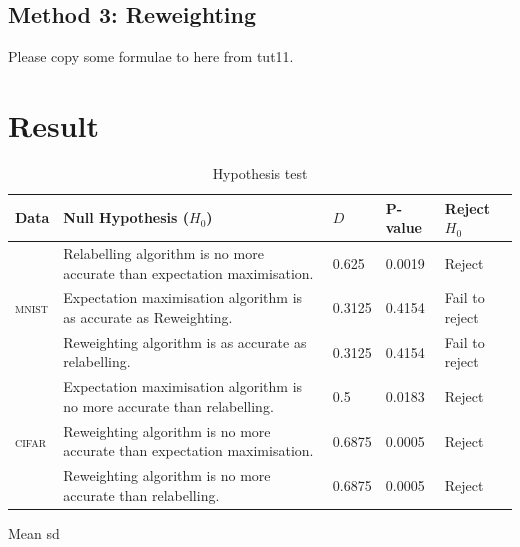 \documentclass{article} %
\begin{document}
\subsection{Method 3: Reweighting}
Please copy some formulae to here from tut11.

\section{Result}
\begin{table}
	\begin{tabular}{lllll}
\hline 
Data & Null Hypothesis ($H_0$) & $D$ & P-value & Reject $H_0$\\
\hline 
\hline 
 & Relabelling algorithm is no more accurate than expectation maximisation.  & 0.625 & 0.0019 & Reject\\
 
 \textsc{mnist} & Expectation maximisation algorithm is as accurate as Reweighting. & 0.3125 & 0.4154 & Fail to reject\\
 
  & Reweighting algorithm is as accurate as relabelling. & 0.3125 & 0.4154 & Fail to reject\\
\hline 
   & Expectation maximisation algorithm is no more accurate than relabelling. & 0.5 & 0.0183 & Reject\\

 \textsc{cifar}  & Reweighting algorithm is no more accurate than expectation maximisation. & 0.6875 & 0.0005 & Reject\\

  & Reweighting algorithm is no more accurate than relabelling.  & 0.6875 & 0.0005 & Reject\\
\hline 
\end{tabular}
	\caption{Hypothesis test}
	\label{tab:HypothesisTest}
\end{table}
\begin{table}
	\caption{Mean sd}
	\label{tab:Meansd}
\end{table}
\end{document}
